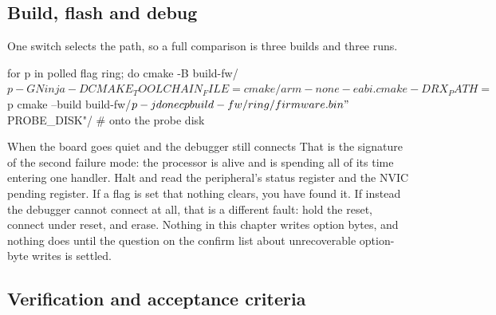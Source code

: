 \subsection*{Build, flash and debug}


One switch selects the path, so a full comparison is three builds and three
runs.

\begin{shellcode}
for p in polled flag ring; do
  cmake -B build-fw/$p -G Ninja -DCMAKE_TOOLCHAIN_FILE=cmake/arm-none-eabi.cmake -DRX_PATH=$p
  cmake --build build-fw/$p -j
done
cp build-fw/ring/firmware.bin "$PROBE_DISK"/   # onto the probe disk
\end{shellcode}

\begin{note}{When the board goes quiet and the debugger still connects}
That is the signature of the second failure mode: the processor is alive and is
spending all of its time entering one handler. Halt and read the peripheral's
status register and the NVIC pending register. If a flag is set that nothing
clears, you have found it. If instead the debugger cannot connect at all, that
is a different fault: hold the reset, connect under reset, and erase. Nothing in
this chapter writes option bytes, and nothing does until the question on the
confirm list about unrecoverable option-byte writes is settled.
\end{note}

\subsection*{Verification and acceptance criteria}

